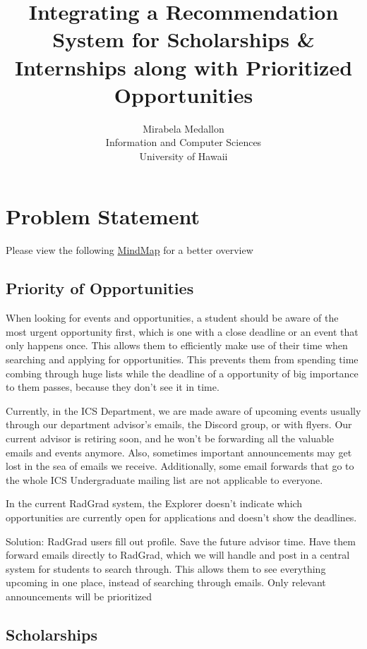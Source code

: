 \documentclass[english]{proposalnsf}
\title{Integrating a Recommendation System for Scholarships \& Internships along with Prioritized Opportunities}
\author{Mirabela Medallon \\ Information and Computer Sciences \\ University of Hawaii}
\begin{document}
	\maketitle
	\tableofcontents
	\newpage
	
	\section{Problem Statement}
	\label{introduction}
	
	Please view the following \href{https://drive.mindmup.com/map/1B_krIFKYAHRDOuSgDn2jVU5e9uZPPjw_}{MindMap} for a better overview 
	
	\subsection{Priority of Opportunities}
	When looking for events and opportunities, a student should be aware of the most urgent opportunity first, which is one with a close deadline or an event that only happens once. This allows them to efficiently make use of their time when searching and applying for opportunities. This prevents them from spending time combing through huge lists while the deadline of a opportunity of big importance to them passes, because they don't see it in time. 
	
	Currently, in the ICS Department, we are made aware of upcoming events usually through our department advisor's emails,  the Discord group, or with flyers. Our current advisor is retiring soon, and he won't be forwarding all the valuable emails and events anymore. Also, sometimes important announcements may get lost in the sea of emails we receive. Additionally, some email forwards that go to the whole ICS Undergraduate mailing list are not applicable to everyone. 
	
	In the current RadGrad system, the Explorer doesn't indicate which opportunities are currently open for applications and doesn't show the deadlines. 
	
	
	Solution: RadGrad users fill out profile. Save the future advisor time. Have them forward emails directly to RadGrad, which we will handle and post in a central system for students to search through. This allows them to see everything upcoming in one place, instead of searching through emails. Only relevant announcements will be prioritized
	
	\subsection{Scholarships}
	
\end{document}
